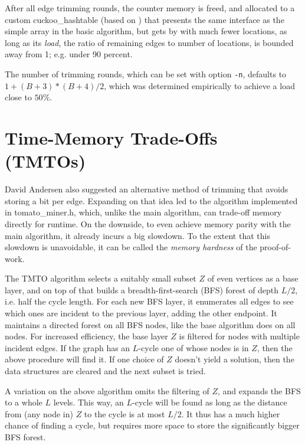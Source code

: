 \documentclass[11pt, oneside]{article}
\begin{document}
After all edge trimming rounds, the counter memory is freed, and allocated to a
custom cuckoo\_hashtable (based on \cite{preshing2013}) that presents the same interface as the
simple array in the basic algorithm, but gets by with much fewer locations, as long as its {\em load},
the ratio of remaining edges to number of locations, is bounded away from 1; e.g. under 90 percent.

The number of trimming rounds, which can be set with option {\tt -n}, defaults to
$1+(B+3)*(B+4)/2$, which was determined empirically to achieve a load close to $50\%$.

\section{Time-Memory Trade-Offs (TMTOs)}
David Andersen also suggested an alternative method of trimming that avoids storing a bit per edge.
Expanding on that idea led to the algorithm implemented in tomato\_miner.h,
which, unlike the main algorithm, can trade-off memory directly for runtime.
On the downside, to even achieve memory parity with the main algorithm, it already incurs a big slowdown.
To the extent that this slowdown is unavoidable, it can be called
the {\em memory hardness} of the proof-of-work.

The TMTO algorithm selects a suitably small subset $Z$ of even vertices as a base layer,
and on top of that builds a breadth-first-search
(BFS) forest of depth $L/2$, i.e. half the cycle length.
For each new BFS layer, it enumerates all edges to see which ones are incident
to the previous layer, adding the other endpoint.
It maintains a directed forest on all BFS nodes, like the base algorithm does on all nodes.
For increased efficiency, the base layer $Z$ is filtered for nodes with multiple incident edges.
If the graph has an $L$-cycle one of whose nodes is in $Z$, then the above procedure will find it.
If one choice of $Z$ doesn't yield a solution, then the data structures are cleared and the next
subset is tried.

A variation on the above algorithm omits the filtering of $Z$, and expands
the BFS to a whole $L$ levels. This way, an $L$-cycle will be found as long as the distance from (any node in)
$Z$ to the cycle is at most $L/2$. It thus has a much higher chance of finding a cycle, but requires
more space to store the significantly bigger BFS forest.
\end{document}
